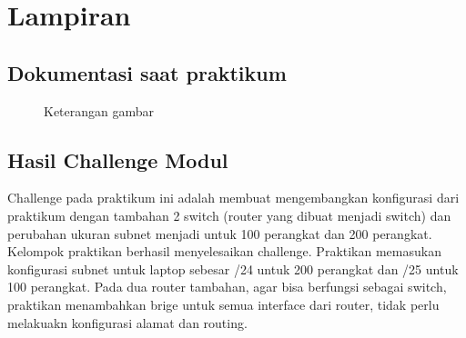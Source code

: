 \section{Lampiran}
\subsection{Dokumentasi saat praktikum}
\begin{figure}[H] 
    \centering
    \caption{Keterangan gambar}
    \label{fig:label_gambar}
\end{figure}

\subsection{Hasil Challenge Modul}
Challenge pada praktikum ini adalah membuat mengembangkan konfigurasi dari praktikum dengan tambahan 2 switch (router yang dibuat menjadi switch) dan perubahan ukuran subnet menjadi untuk 100 perangkat dan 200 perangkat. \\
Kelompok praktikan berhasil menyelesaikan challenge. Praktikan memasukan konfigurasi subnet untuk laptop sebesar /24 untuk 200 perangkat dan /25 untuk 100 perangkat. Pada dua router tambahan, agar bisa berfungsi sebagai switch, praktikan menambahkan brige untuk semua interface dari router, tidak perlu melakuakn konfigurasi alamat dan routing.


